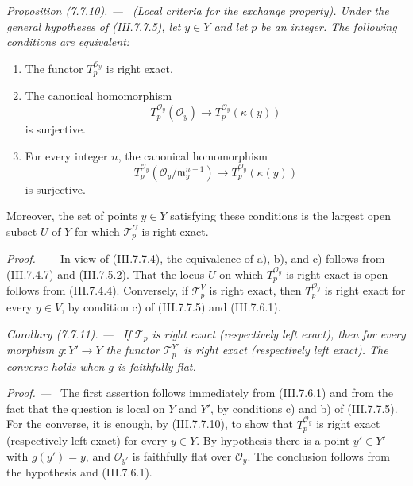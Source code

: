 \documentclass[10pt,oneside]{book}
\newcommand{\sh}[1]{\mathscr{#1}}
\newcommand{\kres}{\kappa}
\newcommand{\sref}[2][]{(#2)}
\newcommand{\oldpage}[2][]{\setcounter{footnote}{0}\marginpar{\scriptsize\textbf{#1}~|~#2}\ignorespaces}
\newenvironment{proposition}[1][]{\par\medskip\noindent\itshape Proposition (#1). ---\ }{\par}
\newenvironment{corollary}[1][]{\par\medskip\noindent\itshape Corollary (#1). ---\ }{\par}
\newenvironment{proof}{\par\medskip\noindent\textit{Proof. ---\ }}{\par}
\begin{document}
\begin{proposition}[7.7.10]
\label{III.7.7.10}
\textnormal{(Local criteria for the exchange property).}
Under the general hypotheses of \sref{III.7.7.5}, let
$y\in Y$ and let $p$ be an integer.  The following
conditions are equivalent:
\begin{enumerate}
  \item[a)] The functor $T_p^{\sh{O}_y}$ is right exact.

  \item[b)] The canonical homomorphism
    \[
      T_p^{\sh{O}_y}(\sh{O}_y)
      \longrightarrow
      T_p^{\sh{O}_y}(\kres(y))
    \]
    is surjective.

  \item[c)] For every integer $n$, the canonical
    homomorphism
    \[
      T_p^{\sh{O}_y}
      (\sh{O}_y/\mathfrak m_y^{n+1})
      \longrightarrow
      T_p^{\sh{O}_y}(\kres(y))
    \]
    is surjective.
\end{enumerate}
Moreover, the set of points $y\in Y$ satisfying these
conditions is the largest open subset $U$ of $Y$ for which
$\sh{T}^U_p$ is right exact.
\end{proposition}

\begin{proof}
In view of \sref{III.7.7.4}, the equivalence of a), b), and
c) follows from \sref{III.7.4.7} and \sref{III.7.5.2}.
That the locus $U$ on which $T_p^{\sh{O}_y}$ is right exact
is open follows from \sref{III.7.4.4}.  Conversely, if
$\sh{T}^V_p$ is right exact, then
$T_p^{\sh{O}_y}$ is right exact for every $y\in V$, by
condition c) of \sref{III.7.7.5} and \sref{III.7.6.1}.
\end{proof}

\begin{corollary}[7.7.11]
\label{III.7.7.11}
If $\sh{T}_p$ is right exact (respectively left exact), then
for every morphism $g:Y'\to Y$ the functor
$\sh{T}^{Y'}_p$ is right exact (respectively left exact).
The converse holds when $g$ is faithfully flat.
\end{corollary}

\begin{proof}
\oldpage[III]{204}
The first assertion follows immediately from
\sref{III.7.6.1} and from the fact that the question is
local on $Y$ and $Y'$, by conditions c) and b) of
\sref{III.7.7.5}.  For the converse, it is enough, by
\sref{III.7.7.10}, to show that $T_p^{\sh{O}_y}$ is right
exact (respectively left exact) for every $y\in Y$.  By
hypothesis there is a point $y'\in Y'$ with $g(y')=y$, and
$\sh{O}_{y'}$ is faithfully flat over $\sh{O}_y$.  The
conclusion follows from the hypothesis and
\sref{III.7.6.1}.
\end{proof}
\end{document}
